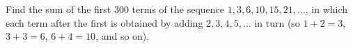 Find the sum of the first $300$ terms of the sequence $1,3,6,10,15,21,\dots$, in which each term after the first is obtained by adding $2,3,4,5,\dots$ in turn (so $1+2=3$, $3+3=6$, $6+4=10$, and so on).
